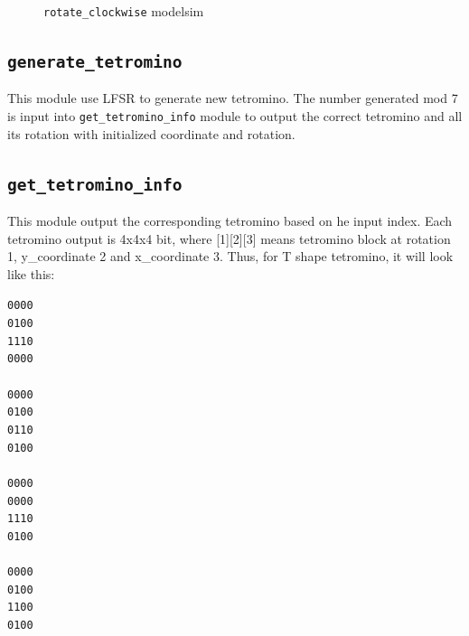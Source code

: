 \documentclass[scale = 0.9]{article}
\newcommand{\code}[1]{\colorbox{light-gray}{\texttt{#1}}} %
\begin{document}
\begin{enumerate}[label=(\alph*)]
\begin{figure}[H]
\begin{center}
            \caption{\code{rotate\_clockwise} modelsim}\label{rotate_clockwise}
          \end{center}
        \end{figure}

\end{enumerate}

\subsection{\code{generate\_tetromino}}
This module use LFSR to generate new tetromino. The number generated mod 7 is input
into \code{get\_tetromino\_info} module to output the correct tetromino and all its
rotation with initialized coordinate and rotation.

\subsection{\code{get\_tetromino\_info}}
This module output the corresponding tetromino based on he input index. Each tetromino
output is 4x4x4 bit, where [1][2][3] means tetromino block at rotation 1, y\_coordinate
2 and x\_coordinate 3. Thus, for T shape tetromino, it will look like this:

\begin{center}
  \code{0000}\\
  \code{0100}\\
  \code{1110}\\
  \code{0000}\\~\\


  \code{0000}\\
  \code{0100}\\
  \code{0110}\\
  \code{0100}\\~\\

  \code{0000}\\
  \code{0000}\\
  \code{1110}\\
  \code{0100}\\~\\

  \code{0000}\\
  \code{0100}\\
  \code{1100}\\
  \code{0100}
\end{center}
\end{document}
